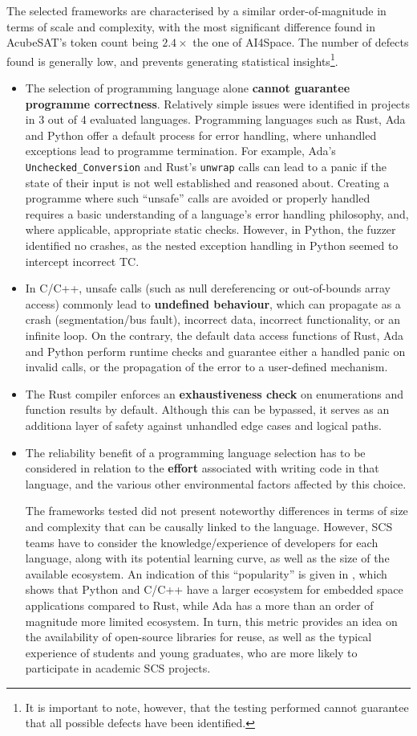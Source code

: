 \documentclass[a4paper,nobib,justified,final]{tufte-book}
\begin{document}
The selected frameworks are characterised by a similar order-of-magnitude in terms of scale and complexity, with the most significant difference found in AcubeSAT's token count being \(2.4\times\) the one of AI4Space. The number of defects found is generally low, and prevents generating statistical insights\footnote{It is important to note, however, that the testing performed cannot guarantee that all possible defects have been identified.}. 
\begin{itemize}
	\item The selection of programming language alone \textbf{cannot guarantee programme correctness}. Relatively simple issues were identified in projects in 3 out of 4 evaluated languages.
	Programming languages such as Rust, Ada and Python offer a default process for error handling, where unhandled exceptions lead to programme termination. For example, Ada's \texttt{Unchecked\_Conversion} and Rust's \texttt{unwrap} calls can lead to a panic if the state of their input is not well established and reasoned about. Creating a programme where such ``unsafe'' calls are avoided or properly handled requires a basic understanding of a language's error handling philosophy, and, where applicable, appropriate static checks. However, in Python, the fuzzer identified no crashes, as the nested exception handling in Python seemed to intercept incorrect \acs{TC}.
	\item In C/C++, unsafe calls (such as null dereferencing or out-of-bounds array access) commonly lead to \textbf{undefined behaviour}, which can propagate as a crash (segmentation/bus fault), incorrect data, incorrect functionality, or an infinite loop. On the contrary, the default data access functions of Rust, Ada and Python perform runtime checks and guarantee either a handled panic on invalid calls, or the propagation of the error to a user-defined mechanism. 
	\item The Rust compiler enforces an \textbf{exhaustiveness check} on enumerations and function results by default. Although this can be bypassed, it serves as an additiona layer of safety against unhandled edge cases and logical paths.
	\item The reliability benefit of a programming language selection has to be considered in relation to the \textbf{effort} associated with writing code in that language, and the various other environmental factors affected by this choice.
	
	The frameworks tested did not present noteworthy differences in terms of size and complexity that can be causally linked to the language. However, \acs{SCS} teams have to consider the knowledge/experience of developers for each language, along with its potential learning curve, as well as the size of the available ecosystem. An indication of this ``popularity'' is given in , which shows that Python and C/C++ have a larger ecosystem for embedded space applications compared to Rust, while Ada has a more than an order of magnitude more limited ecosystem. In turn, this metric provides an idea on the availability of open-source libraries for reuse, as well as the typical experience of students and young graduates, who are more likely to participate in academic \acs{SCS} projects.


\end{itemize}
\end{document}
